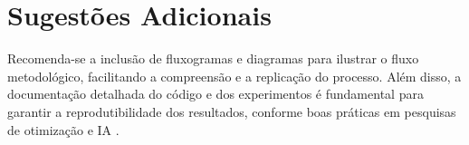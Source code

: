\section{Sugestões Adicionais}
Recomenda-se a inclusão de fluxogramas e diagramas para ilustrar o fluxo metodológico, facilitando a compreensão e a replicação do processo. Além disso, a documentação detalhada do código e dos experimentos é fundamental para garantir a reprodutibilidade dos resultados, conforme boas práticas em pesquisas de otimização e IA \cite{goodfellow2016deep, oliveira2023}.
